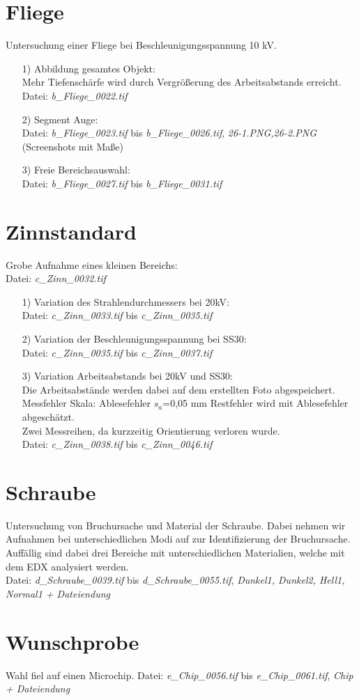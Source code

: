 \section*{Fliege}
Untersuchung einer Fliege bei Beschleunigungsspannung 10 kV.
\begin{itemize}
   \item[1)] Abbildung gesamtes Objekt:\\
   Mehr Tiefenschärfe wird durch Vergrößerung des Arbeitsabstands erreicht. 
   Datei: \textit{b\_Fliege\_0022.tif}
   \item[2)] Segment Auge:\\
   Datei: \textit{b\_Fliege\_0023.tif} bis \textit{b\_Fliege\_0026.tif}, \textit{26-1.PNG,26-2.PNG} (Screenshots mit Maße)
   \item[3)] Freie Bereichsauswahl:\\
   Datei: \textit{b\_Fliege\_0027.tif} bis \textit{b\_Fliege\_0031.tif}
\end{itemize}

\section*{Zinnstandard}
Grobe Aufnahme eines kleinen Bereichs:\\
Datei: \textit{c\_Zinn\_0032.tif}
\begin{itemize}
   \item[1)] Variation des Strahlendurchmessers bei 20kV:\\ 
   Datei: \textit{c\_Zinn\_0033.tif} bis \textit{c\_Zinn\_0035.tif} 
   \item[2)] Variation der Beschleunigungsspannung bei SS30:\\
   Datei: \textit{c\_Zinn\_0035.tif} bis \textit{c\_Zinn\_0037.tif}  
   \item[3)] Variation Arbeitsabstands bei 20kV und SS30:\\
   Die Arbeitsabstände werden dabei auf dem erstellten Foto abgespeichert.\\
   Messfehler Skala: Ablesefehler $s_a$=0,05 mm Restfehler wird mit Ablesefehler abgeschätzt.\\ 
   Zwei Messreihen, da kurzzeitig Orientierung verloren wurde.\\
   Datei: \textit{c\_Zinn\_0038.tif} bis \textit{c\_Zinn\_0046.tif}      
\end{itemize}

\section*{Schraube}
Untersuchung von Bruchursache und Material der Schraube. Dabei nehmen wir Aufnahmen bei unterschiedlichen Modi auf zur Identifizierung der Bruchursache. Auffällig sind dabei drei Bereiche mit unterschiedlichen Materialien, welche mit dem EDX analysiert werden.\\
Datei: \textit{d\_Schraube\_0039.tif} bis \textit{d\_Schraube\_0055.tif}, \textit{Dunkel1, Dunkel2, Hell1, Normal1 + Dateiendung}

\section*{Wunschprobe}
Wahl fiel auf einen Microchip.
Datei: \textit{e\_Chip\_0056.tif} bis \textit{e\_Chip\_0061.tif}, \textit{Chip + Dateiendung}